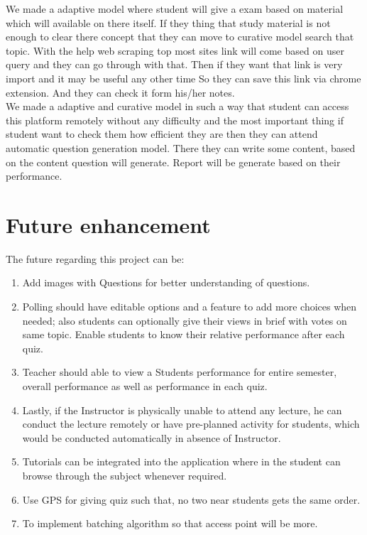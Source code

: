 We made a adaptive model where student will give a exam based on material which will available on there itself. If they thing that study material is not enough to clear there concept that they can move to curative model search that topic. With the help web scraping top most sites link will come based on user query and they can go through with that. Then if they want that link is very import and it may be useful any other time So they can save this link via chrome extension. And they can check it form his/her notes.\\

We made a adaptive and curative model in such a way that student can access this platform remotely without any difficulty and the most important thing if student want to check them how efficient they are then they can attend automatic question generation model. There they can write some content, based on the content question will generate. Report will be generate based on their performance. 
\section{Future enhancement}
The future regarding this project can be:
\begin{enumerate}
	\item Add images with Questions for better understanding of questions. 
	\item Polling should have editable options and a feature to add more choices when needed; also students can optionally give their views in brief with votes on same topic. 
	Enable students to know their relative performance after each quiz. 
	\item Teacher should able to view a Students performance for entire semester, overall performance as well as performance in each quiz.
	\item Lastly, if the Instructor is physically unable to attend any lecture, he can conduct the lecture remotely or have pre-planned activity for students, which would be conducted automatically in absence of Instructor. 
	\item Tutorials can be integrated into the application where in the student can browse through the subject whenever required. 
	\item Use GPS for giving quiz such that, no two near students gets the same order. 
	\item To implement batching algorithm so that access point will be more.
	
\end{enumerate}
